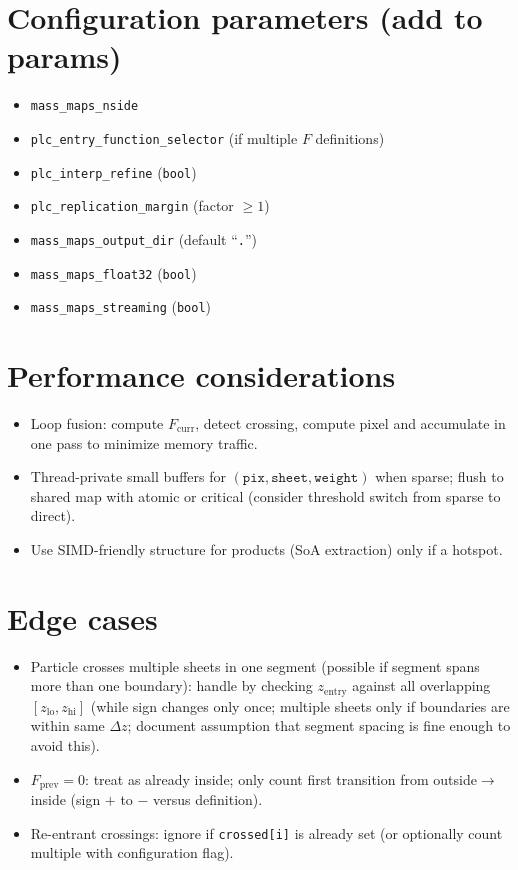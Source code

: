 \documentclass[11pt]{article}
\begin{document}
\section{Configuration parameters (add to params)}
\begin{itemize}
  \item \verb|mass_maps_nside|
  \item \verb|plc_entry_function_selector| (if multiple \(F\) definitions)
  \item \verb|plc_interp_refine| (\verb|bool|)
  \item \verb|plc_replication_margin| (factor \(\ge 1\))
  \item \verb|mass_maps_output_dir| (default ``\texttt{.}'')
  \item \verb|mass_maps_float32| (\verb|bool|)
  \item \verb|mass_maps_streaming| (\verb|bool|)
\end{itemize}

\section{Performance considerations}
\begin{itemize}
  \item Loop fusion: compute \(F_{\mathrm{curr}}\), detect crossing, compute pixel and accumulate in one pass to minimize memory traffic.
  \item Thread-private small buffers for \((\texttt{pix}, \texttt{sheet}, \texttt{weight})\) when sparse; flush to shared map with atomic or critical (consider threshold switch from sparse to direct).
  \item Use SIMD-friendly structure for products (SoA extraction) only if a hotspot.
\end{itemize}

\section{Edge cases}
\begin{itemize}
  \item Particle crosses multiple sheets in one segment (possible if segment spans more than one boundary): handle by checking \(z_{\mathrm{entry}}\) against all overlapping \([z_{\mathrm{lo}}, z_{\mathrm{hi}}]\) (while sign changes only once; multiple sheets only if boundaries are within same \(\Delta z\); document assumption that segment spacing is fine enough to avoid this).
  \item \(F_{\mathrm{prev}} = 0\): treat as already inside; only count first transition from outside\(\to\)inside (sign \(+\) to \( -\) versus definition).
  \item Re-entrant crossings: ignore if \verb|crossed[i]| is already set (or optionally count multiple with configuration flag).
\end{itemize}
\end{document}
